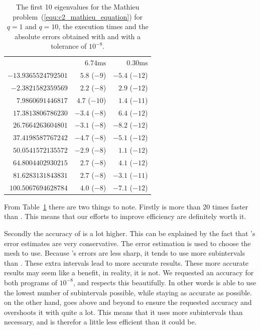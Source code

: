 \begin{table}
\begin{center}
\begin{tabular}[]{rrr}
                          & $6.74\text{ms}$ & $0.30\text{ms}$ \\
      $-13.9365524792501$ & $5.8$ ($-9$)    & $-5.4$ ($-12$)  \\
      $-2.3821582359569$  & $2.2$ ($-8$)    & $2.9$ ($-12$)   \\
      $7.9860691446817$   & $4.7$ ($-10$)   & $1.4$ ($-11$)   \\
      $17.3813806786230$  & $-3.4$ ($-8$)   & $6.4$ ($-12$)   \\
      $26.7664263604801$  & $-3.1$ ($-8$)   & $-8.2$ ($-12$)  \\
      $37.4198587767242$  & $-4.7$ ($-8$)   & $-5.1$ ($-12$)  \\
      $50.0541572135572$  & $-2.9$ ($-8$)   & $1.1$ ($-12$)   \\
      $64.8004402930215$  & $2.7$ ($-8$)    & $4.1$ ($-12$)   \\
      $81.6283131843831$  & $2.7$ ($-8$)    & $-3.1$ ($-11$)  \\
      $100.5067694628784$ & $4.0$ ($-8$)    & $-7.1$ ($-12$)  \\
      \bottomrule
    \end{tabular}
  \end{center}
  \caption{The first 10 eigenvalues for the Mathieu problem~(\ref{equ:c2_mathieu_equation}) for $q=1$ and $q=10$, the execution times and the absolute errors obtained with  and \pyslise{} with a tolerance of $10^{-8}$.}\label{tab:c2_tab1}
\end{table}

From Table~\ref{tab:c2_tab1} there are two things to note. Firstly \pyslise{} is more than 20 times faster than . This means that our efforts to improve efficiency are definitely worth it.

Secondly the accuracy of \pyslise{} is a lot higher. This can be explained by the fact that \pyslise{}'s error estimates are very conservative. The error estimation is used to choose the mesh to use. Because \pyslise{}'s errors are less sharp, it tends to use more subintervals than . These extra intervals lead to more accurate results. These more accurate results may seem like a benefit, in reality, it is not. We requested an accuracy for both programs of $10^{-8}$, and  respects this beautifully. In other words  is able to use the lowest number of subintervals possible, while staying as accurate as possible. \pyslise{} on the other hand, goes above and beyond to ensure the requested accuracy and overshoots it with quite a lot. This means that it uses more subintervals than necessary, and is therefor a little less efficient than it could be.

